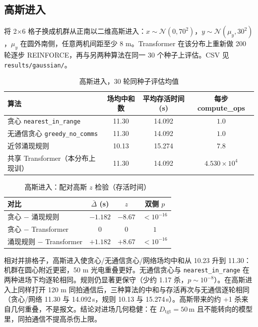 \documentclass[12pt,a4paper]{article}
\begin{document}
\subsection{高斯进入}

将 2$\times$6 格子换成机群从正南以二维高斯进入：$x\sim\mathcal N(0,70^2)$，$y\sim\mathcal N(\mu_y,30^2)$，$\mu_y$ 在圆外南侧，任意两机间距至少 8 m。Transformer 在该分布上重新做 200 轮逐步 REINFORCE，再与另两种算法在同一 30 个种子上评估。CSV 见 \texttt{results/gaussian/}。

\begin{table}[H]
\centering
\caption{高斯进入，30 轮同种子评估均值}
\label{tab:res-g}
\begin{tabular}{lccc}
\toprule
算法 & 场均中和数 & 平均存活时间 (s) & 每步 compute\_ops \\
\midrule
贪心 \texttt{nearest\_in\_range} & 11.30 & 14.092 & $1.0$ \\
无通信贪心 \texttt{greedy\_no\_comms} & 11.30 & 14.092 & $1.0$ \\
近邻涌现规则 & 10.13 & 15.274 & $7.8$ \\
共享 Transformer（本分布上现训） & 11.30 & 14.092 & $4.530\times 10^{4}$ \\
\bottomrule
\end{tabular}
\end{table}

\begin{table}[H]
\centering
\caption{高斯进入：配对高斯 $z$ 检验（存活时间）}
\label{tab:pval-g}
\begin{tabular}{lccc}
\toprule
对比 & $\bar\Delta$ (s) & $z$ & 双侧 $p$ \\
\midrule
贪心 $-$ 涌现规则 & $-1.182$ & $-8.67$ & $<10^{-16}$ \\
贪心 $-$ Transformer & $0$ & $0$ & $1$ \\
涌现规则 $-$ Transformer & $+1.182$ & $+8.67$ & $<10^{-16}$ \\
\bottomrule
\end{tabular}
\end{table}

相对并排格子，高斯进入使贪心/无通信贪心/网络场均中和从 10.23 升到 11.30：机群在圆心附近更密，50 m 光电重叠更好。无通信贪心与 \texttt{nearest\_in\_range} 在两种进场下均逐轮相同。规则仍显著更保守（少约 1.17 杀，$p\sim 10^{-8}$）。在高斯进入上同样打开 120 m 同拍通信后，三种算法的中和与存活再次与无通信逐轮相同（贪心/网络 11.30 与 14.092\,s，规则 10.13 与 15.274\,s）。高斯带来的约 +1 杀来自几何重叠，不是报文。结论对进场几何稳健：在 $D_{\mathrm{tgt}}=50\,\mathrm{m}$ 且不能转向的模型里，同拍通信不提高杀伤上限。
\end{document}
